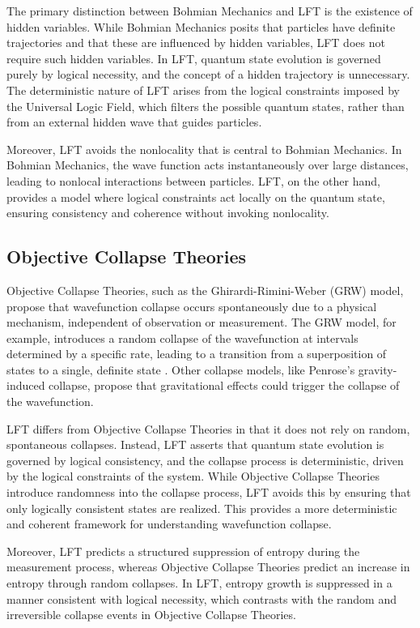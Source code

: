 The primary distinction between Bohmian Mechanics and LFT is the existence of hidden variables. While Bohmian Mechanics posits that particles have definite trajectories and that these are influenced by hidden variables, LFT does not require such hidden variables. In LFT, quantum state evolution is governed purely by logical necessity, and the concept of a hidden trajectory is unnecessary. The deterministic nature of LFT arises from the logical constraints imposed by the Universal Logic Field, which filters the possible quantum states, rather than from an external hidden wave that guides particles.

Moreover, LFT avoids the nonlocality that is central to Bohmian Mechanics. In Bohmian Mechanics, the wave function acts instantaneously over large distances, leading to nonlocal interactions between particles. LFT, on the other hand, provides a model where logical constraints act locally on the quantum state, ensuring consistency and coherence without invoking nonlocality.

\subsection{Objective Collapse Theories}
Objective Collapse Theories, such as the Ghirardi-Rimini-Weber (GRW) model, propose that wavefunction collapse occurs spontaneously due to a physical mechanism, independent of observation or measurement. The GRW model, for example, introduces a random collapse of the wavefunction at intervals determined by a specific rate, leading to a transition from a superposition of states to a single, definite state \cite{ghirardi1986}. Other collapse models, like Penrose's gravity-induced collapse, propose that gravitational effects could trigger the collapse of the wavefunction.

LFT differs from Objective Collapse Theories in that it does not rely on random, spontaneous collapses. Instead, LFT asserts that quantum state evolution is governed by logical consistency, and the collapse process is deterministic, driven by the logical constraints of the system. While Objective Collapse Theories introduce randomness into the collapse process, LFT avoids this by ensuring that only logically consistent states are realized. This provides a more deterministic and coherent framework for understanding wavefunction collapse.

Moreover, LFT predicts a structured suppression of entropy during the measurement process, whereas Objective Collapse Theories predict an increase in entropy through random collapses. In LFT, entropy growth is suppressed in a manner consistent with logical necessity, which contrasts with the random and irreversible collapse events in Objective Collapse Theories.

